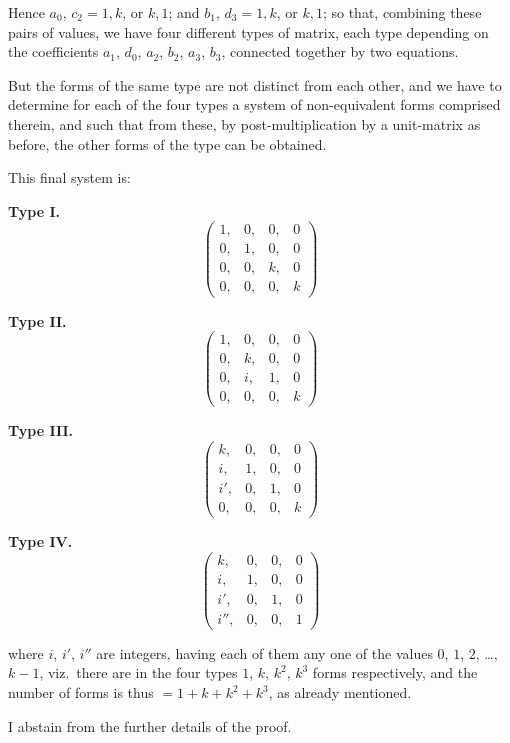 \documentclass[11pt,a4paper]{book}
\begin{document}
Hence $a_0$, $c_2 = 1, k$, or $k, 1$; and $b_1$, $d_3 = 1, k$, or $k, 1$; so that, combining these pairs of values, we have four different types of matrix, each type depending on the coefficients $a_1$, $d_0$, $a_2$, $b_2$, $a_3$, $b_3$, connected together by two equations.

But the forms of the same type are not distinct from each other, and we have to determine for each of the four types a system of non-equivalent forms comprised therein, and such that from these, by post-multiplication by a unit-matrix as before, the other forms of the type can be obtained.

This final system is:

\medskip

\textbf{Type I.}
\[
\begin{pmatrix}
1, & 0, & 0, & 0\\
0, & 1, & 0, & 0\\
0, & 0, & k, & 0\\
0, & 0, & 0, & k
\end{pmatrix}
\]

\textbf{Type II.}
\[
\begin{pmatrix}
1, & 0, & 0, & 0\\
0, & k, & 0, & 0\\
0, & i, & 1, & 0\\
0, & 0, & 0, & k
\end{pmatrix}
\]

\textbf{Type III.}
\[
\begin{pmatrix}
k, & 0, & 0, & 0\\
i, & 1, & 0, & 0\\
i', & 0, & 1, & 0\\
0, & 0, & 0, & k
\end{pmatrix}
\]

\textbf{Type IV.}
\[
\begin{pmatrix}
k, & 0, & 0, & 0\\
i, & 1, & 0, & 0\\
i', & 0, & 1, & 0\\
i'', & 0, & 0, & 1
\end{pmatrix}
\]

\medskip

where $i$, $i'$, $i''$ are integers, having each of them any one of the values $0$, $1$, $2$, \ldots, $k-1$, viz.\ there are in the four types $1$, $k$, $k^2$, $k^3$ forms respectively, and the number of forms is thus $= 1 + k + k^2 + k^3$, as already mentioned.

I abstain from the further details of the proof.
\end{document}
